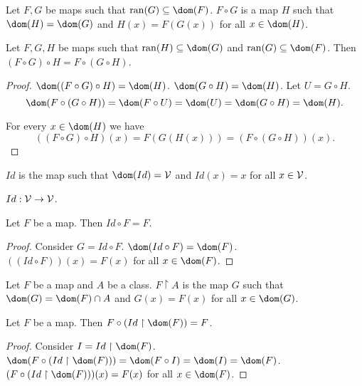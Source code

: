 \documentclass{article}
\newcommand{\range}{\operatorname{ran}}
\begin{document}
\begin{forthel}
\begin{signature}
Let $F,G$ be maps such that $\range(G) \subseteq \dom(F)$.
$F \circ G$ is a map $H$ such that $\dom(H) = \dom(G)$ and
$H(x) = F(G(x))$ for all $x \in \dom(H)$.
\end{signature}

\begin{lemma}
Let $F,G,H$ be maps such that $\range(H) \subseteq \dom(G)$ and
$\range(G) \subseteq \dom(F)$.
Then $(F \circ G) \circ H = F \circ (G \circ H)$.
\end{lemma}
\begin{proof}
$\dom((F \circ G) \circ H) = \dom(H)$.
$\dom(G \circ H) = \dom(H)$. Let $U = G \circ H$.
$$\dom(F \circ (G \circ H)) =
\dom(F \circ U) = \dom(U) = \dom(G \circ H) = \dom(H).$$

For every $x \in \dom(H)$ we have
$$((F \circ G) \circ H)(x) = F(G(H(x))) =
(F \circ (G \circ H))(x).$$
\end{proof}

\begin{signature}
$Id$ is the map such that $\dom(Id) = {\cal V}$
and $Id(x) = x$ for all $x \in {\cal V}$.
\end{signature}

\begin{lemma}
$Id : {\cal V} \rightarrow {\cal V}$.
\end{lemma}

\begin{lemma}
Let $F$ be a map. Then $Id \circ F = F$.
\end{lemma}
\begin{proof} Consider $G = Id \circ F$.
$\dom(Id \circ F) = \dom(F)$.
$((Id \circ F))(x) = F(x)$ for all $x \in \dom(F)$.
\end{proof}

\begin{signature}
Let $F$ be a map and $A$ be a class.
$F\upharpoonright A$ is the map $G$ such that
$\dom(G) = \dom(F) \cap A$ and $G(x)=F(x)$
for all $x \in \dom(G)$.
\end{signature}

\begin{lemma}
Let $F$ be a map. Then $F \circ (Id \upharpoonright \dom(F)) = F$.
\end{lemma}
\begin{proof} Consider $I = Id \upharpoonright \dom(F)$.
$\dom(F \circ (Id \upharpoonright \dom(F))) =
\dom(F \circ I) = \dom(I) = \dom(F)$.
$(F \circ (Id \upharpoonright \dom(F)))(x) = F(x)$
for all $x \in \dom(F)$.
\end{proof}

\end{forthel}
\end{document}
